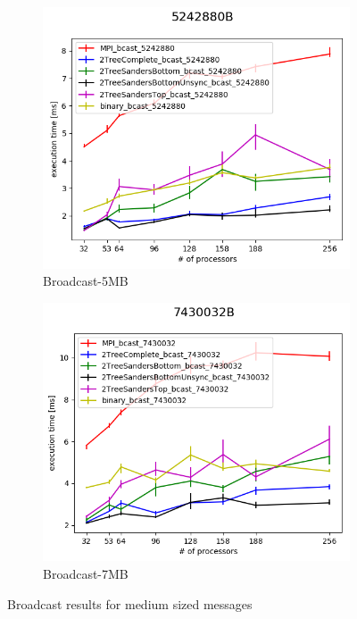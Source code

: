 \documentclass[sigplan,review,anonymous]{acmart}\settopmatter{printfolios=true,printccs=false,printacmref=false}
\begin{document}
\begin{figure}
\centering
\begin{subfigure}{.25\textwidth}
  \centering
  \includegraphics[width=1\linewidth]{images/Results/bcast_all_5242880B.png}
  \caption{Broadcast-5MB}
  \label{bcast-selected-5MB}
\end{subfigure}%
\begin{subfigure}{.25\textwidth}
  \centering
  \includegraphics[width=1\linewidth]{images/Results/bcast_all_7430032B.png}
  \caption{Broadcast-7MB}
  \label{bcast-selected-7MB}
\end{subfigure}
\caption{Broadcast results for medium sized messages}
\label{graph-bcast-medium2-selected}
\end{figure}
\end{document}
